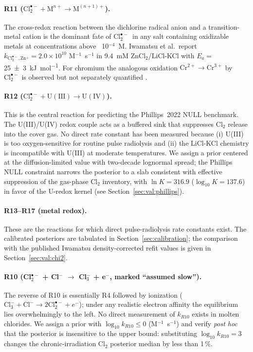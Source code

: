 \documentclass[11pt]{article}
\theoremstyle{plain}
\theoremstyle{definition}
\theoremstyle{remark}
\newcommand{\Clt}{\ensuremath{\mathrm{Cl}_2^{\bullet-}}\xspace}
\newcommand{\Ea}{E_a}
\begin{document}
\paragraph{R11 ($\Clt + \mathrm{M}^{n+} \to \mathrm{M}^{(n+1)+}$).}
The cross-redox reaction between the dichlorine radical anion and a
transition-metal cation is the dominant fate of \Clt\ in any salt containing
oxidizable metals at concentrations above ~10$^{-4}$~M.  Iwamatsu et al.\
report $k_{\Clt,\mathrm{Zn^+}} = 2.0\!\times\!10^{10}$ M$^{-1}$~s$^{-1}$ in
9.4~mM ZnCl$_2$/LiCl-KCl with $\Ea =$ \SI{25 \pm 3}{\kilo\joule\per\mol}.
For chromium the analogous oxidation $\mathrm{Cr}^{2+} \to \mathrm{Cr}^{3+}$
by \Clt is observed but not separately quantified \citep{Iwamatsu2026}.

\paragraph{R12 ($\Clt + \mathrm{U}(\mathrm{III}) \to \mathrm{U}(\mathrm{IV})$).}
This is the central reaction for predicting the Phillips~2022 NULL benchmark.
The U(III)/U(IV) redox couple acts as a buffered sink that suppresses
Cl$_2$ release into the cover gas.  No direct rate constant has been
measured because (i) U(III) is too oxygen-sensitive for routine pulse
radiolysis and (ii) the LiCl-KCl chemistry is incompatible with U(III) at
moderate temperatures.  We assign a prior centered at the diffusion-limited
value with two-decade lognormal spread; the Phillips NULL constraint narrows
the posterior to a slab consistent with effective suppression of the
gas-phase Cl$_2$ inventory, with $\ln K=316.9$ ($\log_{10}K=137.6$) in favor
of the U-redox kernel (see Section~\ref{sec:val:phillips}).

\paragraph{R13--R17 (metal redox).}
These are the reactions for which direct pulse-radiolysis rate constants
exist.  The calibrated posteriors are tabulated in
Section~\ref{sec:calibration}; the comparison with the published Iwamatsu
density-corrected refit values is given in Section~\ref{sec:val:chi2}.

\paragraph{R10 (Cl$_2^{\bullet-}$ + Cl$^-$ $\to$ Cl$_3^-$ + e$^-$, marked
``assumed slow'').}
The reverse of R10 is essentially R4 followed by ionization
($\mathrm{Cl}_3^- + \mathrm{Cl}^- \to 2\Clt + e^-$); under any realistic
electron affinity the equilibrium lies overwhelmingly to the left.  No
direct measurement of $k_{R10}$ exists in molten chlorides.  We assign a
prior with $\log_{10}k_{R10} \leq 0$ (M$^{-1}$~s$^{-1}$) and verify
\textit{post hoc} that the posterior is insensitive to the upper bound:
substituting $\log_{10}k_{R10} = 3$ changes the chronic-irradiation
Cl$_2$ posterior median by less than 1\,\%.
\end{document}
